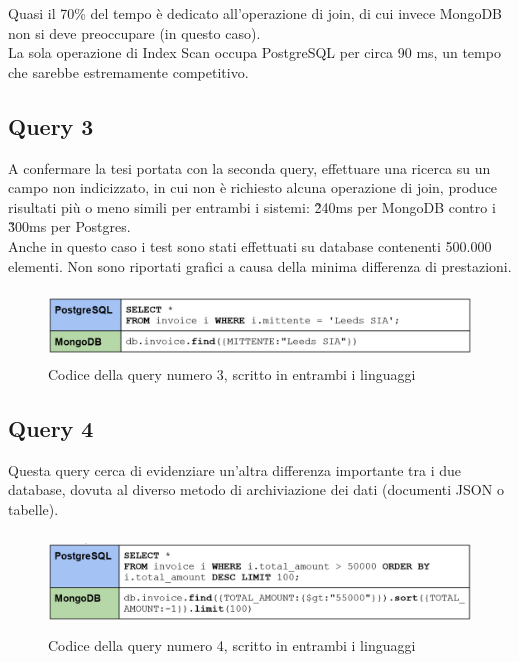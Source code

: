 \noindent Quasi il 70\% del tempo è dedicato all'operazione di join, di cui invece MongoDB non si deve preoccupare (in questo caso).\\
La sola operazione di Index Scan occupa PostgreSQL per circa 90 ms, un tempo che sarebbe estremamente competitivo.\\


\subsection{Query 3}
A confermare la tesi portata con la seconda query, effettuare una ricerca su un campo non indicizzato, in cui non è richiesto alcuna operazione di join, produce risultati più o meno simili per entrambi i sistemi: \~240ms per MongoDB contro i \~300ms per Postgres.\\
Anche in questo caso i test sono stati effettuati su database contenenti 500.000 elementi. Non sono riportati grafici a causa della minima differenza di prestazioni.\\

\begin{figure}[htbp]
\begin{center}
\includegraphics[height=5em]{immagini/query/query3.png}
\caption{Codice della query numero 3, scritto in entrambi i linguaggi}
\end{center}
\end{figure}


\subsection{Query 4}
Questa query cerca di evidenziare un'altra differenza importante tra i due database, dovuta al diverso metodo di archiviazione dei dati (documenti JSON o tabelle).\\

\begin{figure}[htbp]
\begin{center}
\includegraphics[height=7em]{immagini/query/query4.png}
\caption{Codice della query numero 4, scritto in entrambi i linguaggi}
\end{center}
\end{figure}

